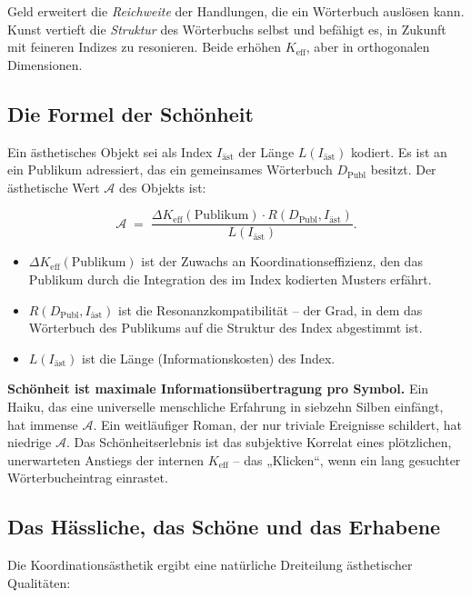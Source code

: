 \documentclass[12pt,a4paper]{article}
\newcommand{\Keff}{K_{\mathrm{eff}}}
\begin{document}
Geld erweitert die \emph{Reichweite} der Handlungen, die ein Wörterbuch auslösen kann. Kunst vertieft die \emph{Struktur} des Wörterbuchs selbst und befähigt es, in Zukunft mit feineren Indizes zu resonieren. Beide erhöhen \(K_{\mathrm{eff}}\), aber in orthogonalen Dimensionen.

\subsection{Die Formel der Schönheit}

Ein ästhetisches Objekt sei als Index \(I_{\mathrm{äst}}\) der Länge \(L(I_{\mathrm{äst}})\) kodiert. Es ist an ein Publikum adressiert, das ein gemeinsames Wörterbuch \(D_{\mathrm{Publ}}\) besitzt. Der ästhetische Wert \(\mathcal{A}\) des Objekts ist:

\[
\mathcal{A} \; = \; \frac{\Delta\Keff(\text{Publikum}) \cdot R(D_{\mathrm{Publ}}, I_{\mathrm{äst}})}{L(I_{\mathrm{äst}})}.
\]

\begin{itemize}[leftmargin=*]
	\item \(\Delta\Keff(\text{Publikum})\) ist der Zuwachs an Koordinationseffizienz, den das Publikum durch die Integration des im Index kodierten Musters erfährt.
	\item \(R(D_{\mathrm{Publ}}, I_{\mathrm{äst}})\) ist die Resonanzkompatibilität – der Grad, in dem das Wörterbuch des Publikums auf die Struktur des Index abgestimmt ist.
	\item \(L(I_{\mathrm{äst}})\) ist die Länge (Informationskosten) des Index.
\end{itemize}

\textbf{Schönheit ist maximale Informationsübertragung pro Symbol.} Ein Haiku, das eine universelle menschliche Erfahrung in siebzehn Silben einfängt, hat immense \(\mathcal{A}\). Ein weitläufiger Roman, der nur triviale Ereignisse schildert, hat niedrige \(\mathcal{A}\). Das Schönheitserlebnis ist das subjektive Korrelat eines plötzlichen, unerwarteten Anstiegs der internen \(K_{\mathrm{eff}}\) – das „Klicken“, wenn ein lang gesuchter Wörterbucheintrag einrastet.

\subsection{Das Hässliche, das Schöne und das Erhabene}

Die Koordinationsästhetik ergibt eine natürliche Dreiteilung ästhetischer Qualitäten:
\end{document}
